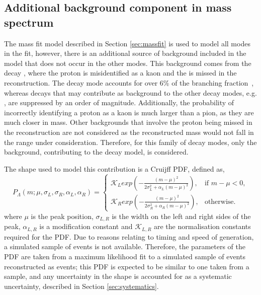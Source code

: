 \subsection{Additional background component in \kk mass spectrum}
\label{sec:cpfit:Lb2LcKst}

The mass fit model described in Section \ref{sec:massfit} is used to model all \Dz modes in the \CP fit, however, there is an additional source of background included in the \kk model that does not occur in the other modes. This background comes from the decay , where the proton is misidentified as a kaon and the \pion is missed in the reconstruction. The decay mode  accounts for over 6\% of the \Lc branching fraction~\cite{PDG2016}, whereas \Lc decays that may contribute as background to the other \Dz decay modes, e.g. , are suppressed by an order of magnitude. Additionally, the probability of incorrectly identifying a proton as a kaon is much larger than a pion, as they are much closer in mass. Other backgrounds that involve the proton being missed in the reconstruction are not considered as the reconstructed \Bm mass would not fall in the range under consideration. Therefore, for this family of decay modes, only the  background, contributing to the \kk decay model, is considered.

The shape used to model this  contribution is a Cruijff PDF, defined as,
\begin{equation}
  P_{\Lambda}(m; \mu,\sigma_L,\sigma_R,\alpha_L,\alpha_R)=
\begin{cases}
    \mathcal{K}_{L} exp \left( -\frac{(m-\mu)^2}{2\sigma_L^2 + \alpha_L(m-\mu)^2} \right) ,     & \text{if } m-\mu < 0, \\
    \mathcal{K}_{R} exp \left( -\frac{(m-\mu)^2}{2\sigma_R^2 + \alpha_R(m-\mu)^2} \right) ,     & \text{otherwise.}
\end{cases}
\label{Cruijff}
\end{equation}%
where $\mu$ is the peak position, $\sigma_{L,R}$ is the width on the left and right sides of the peak, $\alpha_{L,R}$ is a modification constant and $\mathcal{K}_{L,R}$ are the normalisation constants required for the PDF. Due to reasons relating to timing and speed of generation, a simulated sample of  events is not available. Therefore, the parameters of the PDF are taken from a maximum likelihood fit to a simulated sample of \decay{\Lb}{\Lc\Km} events reconstructed as \decay{\Bm}{\D\Km} events; this PDF is expected to be similar to one taken from a  sample, and any uncertainty in the shape is accounted for as a systematic uncertainty, described in Section \ref{sec:systematics}.


